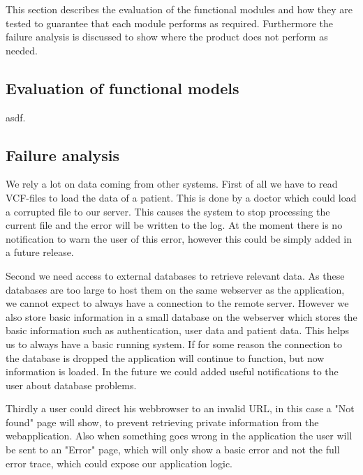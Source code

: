 This section describes the evaluation of the functional modules and how they are tested to guarantee that each module performs as required.
Furthermore the failure analysis is discussed to show where the product does not perform as needed.

\subsection{Evaluation of functional models}
asdf.

\subsection{Failure analysis}
We rely a lot on data coming from other systems. First of all we have to read VCF-files to load the data of a patient. This is done by a doctor which could load a corrupted file to our server. This causes the system to stop processing the current file and the error will be written to the log. At the moment there is no notification to warn the user of this error, however this could be simply added in a future release.

Second we need access to external databases to retrieve relevant data. As these databases are too large to host them on the same webserver as the application, we cannot expect to always have a connection to the remote server. However we also store basic information in a small database on the webserver which stores the basic information such as authentication, user data and patient data. This helps us to always have a basic running system. If for some reason the connection to the database is dropped the application will continue to function, but now information is loaded. In the future we could added useful notifications to the user about database problems.

Thirdly a user could direct his webbrowser to an invalid URL, in this case a "Not found" page will show, to prevent retrieving private information from the webapplication. Also when something goes wrong in the application the user will be sent to an "Error" page, which will only show a basic error and not the full error trace, which could expose our application logic.